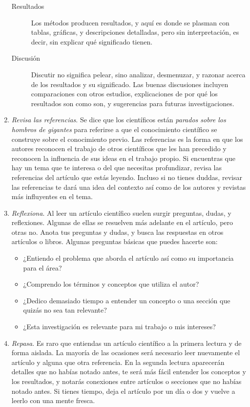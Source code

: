 \begin{enumerate}
\begin{description}
          \item[Resultados] Los métodos producen resultados, y aquí es donde
            se plasman con tablas, gráficas, y descripciones detalladas,
            pero sin interpretación, es decir, sin explicar qué
            significado tienen.
          \item[Discusión] Discutir no significa pelear, sino analizar,
            desmenuzar, y razonar acerca de los resultados y su
            significado.
            Las buenas discusiones incluyen comparaciones con otros
            estudios, explicaciones de por qué los resultados son como
            son, y sugerencias para futuras investigaciones.
        \end{description}
  \item \emph{Revisa las referencias}. Se dice que los científicos están
        \emph{parados sobre los hombros de gigantes} para referirse a que el
        conocimiento científico se construye sobre el conocimiento previo.
        Las referencias es la forma en que los autores reconocen el trabajo de
        otros científicos que les han precedido y reconocen la influencia de
        sus ideas en el trabajo propio.
        Si encuentras que hay un tema que te interesa o del que necesitas
        profundizar, revisa las referencias del artículo que estás leyendo.
        Incluso si no tienes duddas, revisar las referencias te dará una idea
        del contexto así como de los autores y revistas más influyentes en el
        tema.
  \item \emph{Reflexiona}. Al leer un artículo científico suelen surgir
        preguntas, dudas, y reflexiones.
        Algunas de ellas se resuelven más adelante en el artículo, pero otras
        no.
        Anota tus preguntas y dudas, y busca las respuestas en otros artículos
        o libros.
        Algunas preguntas básicas que puedes hacerte son:
        \begin{itemize}
          \item ¿Entiendo el problema que aborda el artículo así como su
                importancia para el área?
          \item ¿Comprendo los términos y conceptos que utiliza el autor?
          \item ¿Dedico demasiado tiempo a entender un concepto o una
                sección que quizás no sea tan relevante?
          \item ¿Esta investigación es relevante para mi trabajo o mis
                intereses?
        \end{itemize}
  \item \emph{Repasa}. Es raro que entiendas un artículo científico a la
        primera lectura y de forma aislada.
        La mayoría de las ocasiones será necesario leer nuevamente el artículo
        y alguna que otra referencia.
        En la segunda lectura aparecerán detalles que no habías notado antes,
        te será más fácil entender los conceptos y los resultados, y notarás
        conexiones entre artículos o secciones que no habías notado antes.
        Si tienes tiempo, deja el artículo por un día o dos y vuelve a leerlo
        con una mente fresca.
\end{enumerate}

